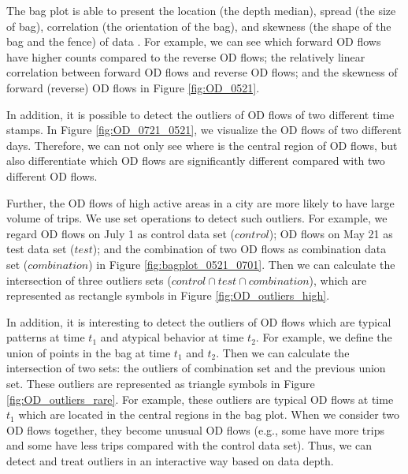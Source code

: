 \documentclass[a4paper,UKenglish]{lipics-v2016}
\begin{document}
The bag plot is able to present the location (the depth median), spread (the size of bag), correlation (the orientation of the bag), and skewness (the shape of the bag and the fence) of data \cite{rousseeuw99AS}. For example, we can see which forward OD flows have higher counts compared to the reverse OD flows; the relatively linear correlation between forward OD flows and reverse OD flows; and the skewness of forward (reverse) OD flows in Figure \ref{fig:OD_0521}. 

In addition, it is possible to detect the outliers of OD flows of two different time stamps. In Figure \ref{fig:OD_0721_0521}, we visualize the OD flows of two different days. Therefore, we can not only see where is the central region of OD flows, but also differentiate which OD flows are significantly different compared with two different OD flows.

Further, the OD flows of high active areas in a city are more likely to have large volume of trips. We use set operations to detect such outliers. For example, we regard OD flows on July 1  as control data set ($control$); OD flows on May 21 as test data set ($test$); and the combination of two OD flows as combination data set ($combination$) in Figure \ref{fig:bagplot_0521_0701}. Then we can calculate the intersection of three outliers sets ($control \cap test \cap combination$), which are represented as rectangle symbols in Figure \ref{fig:OD_outliers_high}. 

In addition, it is interesting to detect the outliers of OD flows which are typical patterns at time $t_1$ and atypical behavior at time $t_2$.  For example, we define the union of points in the bag at time $t_1$ and $t_2$. Then we can calculate the intersection of two sets: the outliers of combination set and the previous union set. These outliers are represented as triangle symbols in Figure \ref{fig:OD_outliers_rare}. For example, these outliers are typical OD flows at time $t_1$ which are located in the central regions in the bag plot. When we consider two OD flows together, they become unusual OD flows (e.g., some have more trips and some have less trips compared with the control data set). Thus, we can detect and treat outliers in an interactive way based on data depth.

\end{document}
